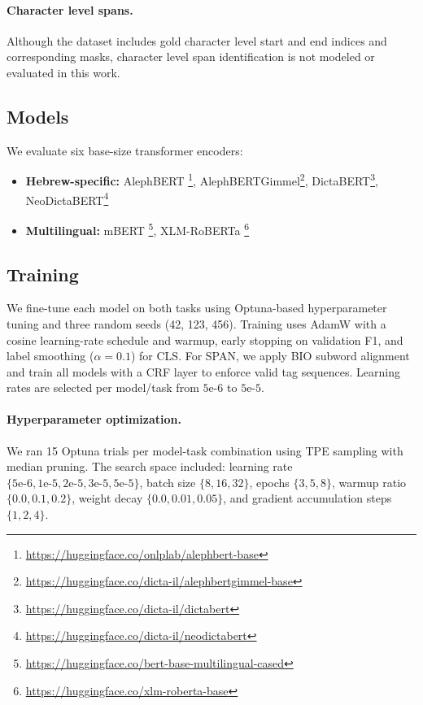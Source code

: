 \documentclass[11pt]{article}
\begin{document}
\paragraph{Character level spans.}
Although the dataset includes gold character level start and end indices and corresponding masks, character level span identification is not modeled or evaluated in this work.

\subsection{Models}

We evaluate six base-size transformer encoders:
\begin{itemize}
    \item \textbf{Hebrew-specific:} AlephBERT \citep{seker2022alephbert}\footnote{\url{https://huggingface.co/onlplab/alephbert-base}}, AlephBERTGimmel\footnote{\url{https://huggingface.co/dicta-il/alephbertgimmel-base}}, DictaBERT\footnote{\url{https://huggingface.co/dicta-il/dictabert}}, NeoDictaBERT\footnote{\url{https://huggingface.co/dicta-il/neodictabert}}
    \item \textbf{Multilingual:} mBERT \citep{devlin2019bert}\footnote{\url{https://huggingface.co/bert-base-multilingual-cased}}, XLM-RoBERTa \citep{conneau2020unsupervised}\footnote{\url{https://huggingface.co/xlm-roberta-base}}
\end{itemize}

\subsection{Training}

We fine-tune each model on both tasks using Optuna-based hyperparameter tuning and three random seeds (42, 123, 456). Training uses AdamW with a cosine learning-rate schedule and warmup, early stopping on validation F1, and label smoothing ($\alpha{=}0.1$) for CLS. For SPAN, we apply BIO subword alignment and train all models with a CRF layer to enforce valid tag sequences. Learning rates are selected per model/task from $5\text{e-}6$ to $5\text{e-}5$.

\paragraph{Hyperparameter optimization.}
We ran 15 Optuna trials per model-task combination using TPE sampling with median pruning. The search space included: learning rate $\{5\text{e-}6, 1\text{e-}5, 2\text{e-}5, 3\text{e-}5, 5\text{e-}5\}$, batch size $\{8, 16, 32\}$, epochs $\{3, 5, 8\}$, warmup ratio $\{0.0, 0.1, 0.2\}$, weight decay $\{0.0, 0.01, 0.05\}$, and gradient accumulation steps $\{1, 2, 4\}$.
\end{document}
